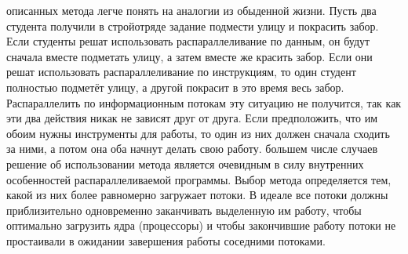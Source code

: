 {	 описанных метода легче понять на аналогии из обыденной жизни. Пусть два студента получили в стройотряде задание подмести улицу и покрасить забор. Если студенты решат использовать распараллеливание по данным, он будут сначала вместе подметать улицу, а затем вместе же красить забор. Если они решат использовать распараллеливание по инструкциям, то один студент полностью подметёт улицу, а другой покрасит в это время весь забор. Распараллелить по информационным потокам эту ситуацию не получится, так как эти два действия никак не зависят друг от друга. Если предположить, что им обоим нужны инструменты для работы, то один из них должен сначала сходить за ними, а потом она оба начнут делать свою работу.
	 большем числе случаев решение об использовании метода является очевидным в силу внутренних особенностей распараллеливаемой программы. Выбор метода определяется тем, какой из них более равномерно загружает потоки. В идеале все потоки должны приблизительно одновременно заканчивать выделенную им работу, чтобы оптимально загрузить ядра (процессоры) и чтобы закончившие работу потоки не простаивали в ожидании завершения работы соседними потоками.
	\par
}